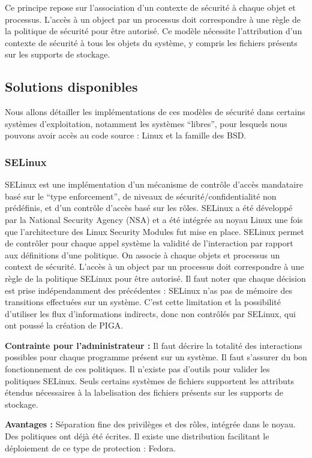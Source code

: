 Ce principe repose sur l'association d'un contexte de sécurité à chaque objet et processus. L'accès à un object par un processus doit correspondre à une règle de la politique de sécurité pour être autorisé. Ce modèle nécessite l'attribution d'un contexte de sécurité à tous les objets du système, y compris les fichiers présents sur les supports de stockage.

\subsection{Solutions disponibles}

Nous allons détailler les implémentations de ces modèles de sécurité dans certains systèmes d'exploitation, notamment les systèmes ``libres'', pour lesquels nous pouvons avoir accès au code source : Linux et la famille des BSD.

\subsubsection{SELinux}

SELinux est une implémentation d'un mécanisme de contrôle d'accès mandataire basé sur le ``type enforcement'', de niveaux de sécurité/confidentialité non prédéfinis, et d'un contrôle d'accès basé sur les rôles. SELinux a été développé par la National Security Agency (NSA) et a été intégrée au noyau Linux une fois que l'architecture des Linux Security Modules fut mise en place. SELinux permet de contrôler pour chaque appel système la validité de l'interaction par rapport aux définitions d'une politique. On associe à chaque objets et processus un context de sécurité. L'accès à un object par un processus doit correspondre à une règle de la politique SELinux pour être autorisé. Il faut noter que chaque décision est prise indépendamment des précédentes : SELinux n'as pas de mémoire des transitions effectuées sur un système. C'est cette limitation et la possibilité d'utiliser les flux d'informations indirects, donc non contrôlés par SELinux, qui ont poussé la création de PIGA.
\begin{list}{}{}
 \item \textbf{Contrainte pour l'administrateur :} Il faut décrire la totalité des interactions possibles pour chaque programme présent sur un système. Il faut s'assurer du bon fonctionnement de ces politiques. Il n'existe pas d'outils pour valider les politiques SELinux. Seuls certains systèmes de fichiers supportent les attributs étendus nécessaires à la labelisation des fichiers présents sur les supports de stockage.
 \item \textbf{Avantages :} Séparation fine des privilèges et des rôles, intégrée dans le noyau. Des politiques ont déjà été écrites. Il existe une distribution facilitant le déploiement de ce type de protection : Fedora.
\end{list}

